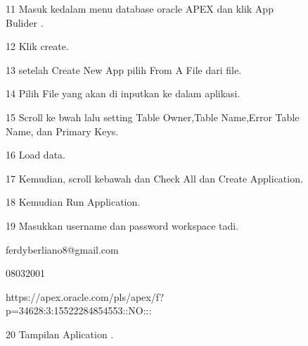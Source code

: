 \begin{enumerate}
\begin{figure}
\item[11] Masuk kedalam menu database oracle APEX dan klik App Bulider .
\label{gambar}
\end{figure}
\begin{figure}
\item[12] Klik create.
\label{gambar}
\end{figure}
\begin{figure}
\item[13]setelah Create New App pilih From A File dari file.
\label{gambar}
\end{figure}

\begin{figure}
\item[14] Pilih File yang akan di inputkan ke dalam aplikasi.
\label{gambar}
\end{figure}

\begin{figure}
\item[15] Scroll ke bwah lalu setting Table Owner,Table Name,Error Table Name, dan Primary Keys.
\label{gambar}
\end{figure}

\begin{figure}
\item[16] Load data.
\label{gambar}
\end{figure}

\begin{figure}
\item[17] Kemudian, scroll kebawah dan Check All dan Create Application. 
\label{gambar}
\end{figure}

\begin{figure}
\item[18] Kemudian Run Application.
\label{gambar}
\end{figure}

\begin{figure}
\item[19]Masukkan username dan password workspace tadi.

ferdyberliano8@gmail.com


08032001


https://apex.oracle.com/pls/apex/f?p=34628:3:15522284854553::NO:::
\label{gambar}
\end{figure}

\begin{figure}
\item[20]Tampilan Aplication .
\label{gambar}
\end{figure}


\end{enumerate}
